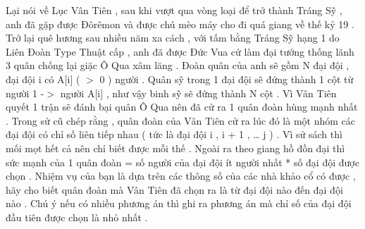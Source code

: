 Lại nói về Lục Vân Tiên , sau khi vượt qua vòng loại để trở thành Tráng Sỹ , anh đã gặp được Đôrêmon và được chú mèo máy cho đi quá giang về thế kỷ 19 . Trở lại quê hương sau nhiều năm xa cách , với tấm bằng Tráng Sỹ hạng 1 do Liên Đoàn Type Thuật cấp , anh đã được Đức Vua cử làm đại tướng thống lãnh 3 quân chống lại giặc Ô Qua xâm lăng . Đoàn quân của anh sẽ gồm N đại đội , đại đội i có A[i] ( $>$ 0 ) người . Quân sỹ trong 1 đại đội sẽ đứng thành 1 cột từ người 1 -$>$ người A[i] , như vậy binh sỹ sẽ đứng thành N cột . Vì Vân Tiên quyết 1 trận sẽ đánh bại quân Ô Qua nên đã cử ra 1 quân đoàn hùng mạnh nhất . Trong sử cũ chép rằng , quân đoàn của Vân Tiên cử ra lúc đó là một nhóm các đại đội có chỉ số liên tiếp nhau ( tức là đại đội i , i + 1 , … j ) . Vì sử sách thì mối mọt hết cả nên chỉ biết được mỗi thế . Ngoài ra theo giang hồ đồn đại thì sức mạnh của 1 quân đoàn = số người của đại đội ít người nhất * số đại đội được chọn . Nhiệm vụ của bạn là dựa trên các thông số của các nhà khảo cổ có được , hãy cho biết quân đoàn mà Vân Tiên đã chọn ra là từ đại đội nào đến đại đội nào . Chú ý nếu có nhiều phương án thì ghi ra phương án mà chỉ số của đại đội đầu tiên được chọn là nhỏ nhất .